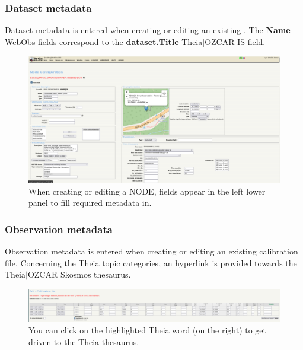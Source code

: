 \newpage

\subsubsection{Dataset metadata}

Dataset metadata is entered when creating or editing an existing . The \textbf{Name} WebObs  fields correspond to the \textbf{dataset.Title} Theia$\vert$OZCAR IS field.

\begin{figure}[!h]
	\centering
	\includegraphics[width=\textwidth, scale=0.4]{figures/formNODE.png}
	\caption{When creating or editing a NODE, fields appear in the left lower panel to fill required metadata in.}
\end{figure}


\subsubsection{Observation metadata}

Observation metadata is entered when creating or editing an existing calibration file. Concerning the Theia topic categories, an hyperlink is provided towards the Theia$\vert$OZCAR Skosmos thesaurus.

\begin{figure}[!h]
	\centering
	\includegraphics[width=\textwidth]{figures/calib_file_form.png}
	\caption{You can click on the highlighted Theia word (on the right) to get driven to the Theia thesaurus.}
\end{figure}


